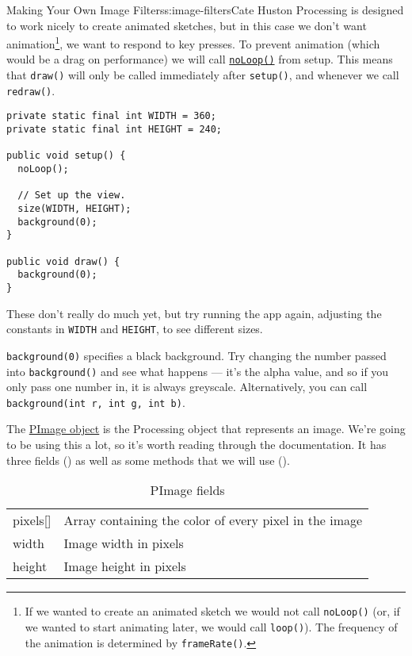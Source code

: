 \begin{aosachapter}{Making Your Own Image Filters}{s:image-filters}{Cate Huston}
Processing is designed to work nicely to create animated sketches, but
in this case we don't want animation\footnote{If we wanted to create an
  animated sketch we would not call \texttt{noLoop()} (or, if we wanted
  to start animating later, we would call \texttt{loop()}). The
  frequency of the animation is determined by \texttt{frameRate()}.}, we
want to respond to key presses. To prevent animation (which would be a
drag on performance) we will call
\href{http://www.processing.org/reference/noLoop_.html}{\texttt{noLoop()}}
from setup. This means that \texttt{draw()} will only be called
immediately after \texttt{setup()}, and whenever we call
\texttt{redraw()}.

\begin{verbatim}
private static final int WIDTH = 360;
private static final int HEIGHT = 240;

public void setup() {
  noLoop();

  // Set up the view.
  size(WIDTH, HEIGHT);
  background(0);
}
    
public void draw() {
  background(0);
}
\end{verbatim}

These don't really do much yet, but try running the app again, adjusting
the constants in \texttt{WIDTH} and \texttt{HEIGHT}, to see different
sizes.

\texttt{background(0)} specifies a black background. Try changing the
number passed into \texttt{background()} and see what happens --- it's
the alpha value, and so if you only pass one number in, it is always
greyscale. Alternatively, you can call
\texttt{background(int r, int g, int b)}.

\label{pimage}

The \href{http://processing.org/reference/PImage.html}{PImage object} is
the Processing object that represents an image. We're going to be using
this a lot, so it's worth reading through the documentation. It has
three fields () as well as
some methods that we will use
().

\begin{table}
\centering
{\footnotesize
{}
\begin{tabular}{ll}
\hline
pixels[] & Array containing the color of every pixel in the image \\
width & Image width in pixels \\
height & Image height in pixels \\
\hline
\end{tabular}
}
\caption{PImage fields}
\label{500l.imagefilters.pimagefields}
\end{table}


\end{aosachapter}
